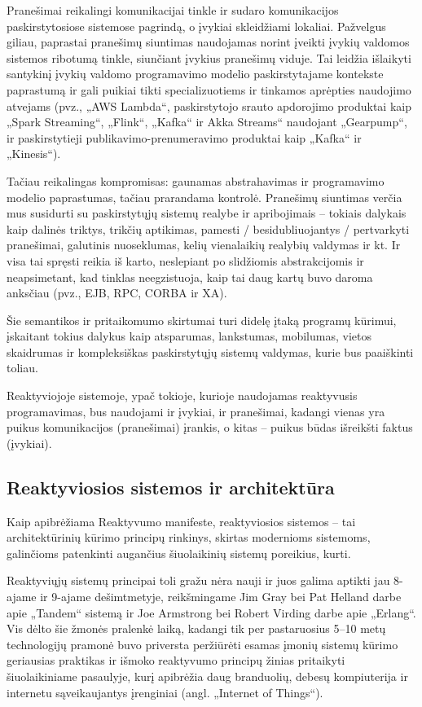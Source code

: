 Pranešimai reikalingi komunikacijai tinkle ir sudaro komunikacijos paskirstytosiose sistemose pagrindą, o įvykiai skleidžiami lokaliai. Pažvelgus giliau, paprastai pranešimų siuntimas naudojamas norint įveikti įvykių valdomos sistemos ribotumą tinkle, siunčiant įvykius pranešimų viduje. Tai leidžia išlaikyti santykinį įvykių valdomo programavimo modelio paskirstytajame kontekste paprastumą ir gali puikiai tikti specializuotiems ir tinkamos aprėpties naudojimo atvejams (pvz., „AWS Lambda“, paskirstytojo srauto apdorojimo produktai kaip „Spark Streaming“, „Flink“, „Kafka“ ir Akka Streams“ naudojant „Gearpump“, ir paskirstytieji publikavimo-prenumeravimo produktai kaip „Kafka“ ir „Kinesis“).

Tačiau reikalingas kompromisas: gaunamas abstrahavimas ir programavimo modelio paprastumas, tačiau prarandama kontrolė. Pranešimų siuntimas verčia mus susidurti su paskirstytųjų sistemų realybe ir apribojimais – tokiais dalykais kaip dalinės triktys, trikčių aptikimas, pamesti / besidubliuojantys / pertvarkyti pranešimai, galutinis nuoseklumas, kelių vienalaikių realybių valdymas ir kt. Ir visa tai spręsti reikia iš karto, neslepiant po slidžiomis abstrakcijomis ir neapsimetant, kad tinklas neegzistuoja, kaip tai daug kartų buvo daroma anksčiau (pvz., EJB, RPC, CORBA ir XA).

Šie semantikos ir pritaikomumo skirtumai turi didelę įtaką programų kūrimui, įskaitant tokius dalykus kaip atsparumas, lankstumas, mobilumas, vietos skaidrumas ir kompleksiškas paskirstytųjų sistemų valdymas, kurie bus paaiškinti toliau.

Reaktyviojoje sistemoje, ypač tokioje, kurioje naudojamas reaktyvusis programavimas, bus naudojami ir įvykiai, ir pranešimai, kadangi vienas yra puikus komunikacijos (pranešimai) įrankis, o kitas – puikus būdas išreikšti faktus (įvykiai).

\subsection{Reaktyviosios sistemos ir architektūra}

Kaip apibrėžiama Reaktyvumo manifeste, reaktyviosios sistemos – tai architektūrinių kūrimo principų rinkinys, skirtas modernioms sistemoms, galinčioms patenkinti augančius šiuolaikinių sistemų poreikius, kurti.

Reaktyviųjų sistemų principai toli gražu nėra nauji ir juos galima aptikti jau 8-ajame ir 9-ajame dešimtmetyje, reikšmingame Jim Gray bei Pat Helland darbe apie „Tandem“ sistemą ir Joe Armstrong bei Robert Virding darbe apie „Erlang“. Vis dėlto šie žmonės pralenkė laiką, kadangi tik per pastaruosius 5–10 metų technologijų pramonė buvo priversta peržiūrėti esamas įmonių sistemų kūrimo geriausias praktikas ir išmoko reaktyvumo principų žinias pritaikyti šiuolaikiniame pasaulyje, kurį apibrėžia daug branduolių, debesų kompiuterija ir internetu sąveikaujantys įrenginiai (angl. „Internet of Things“).

